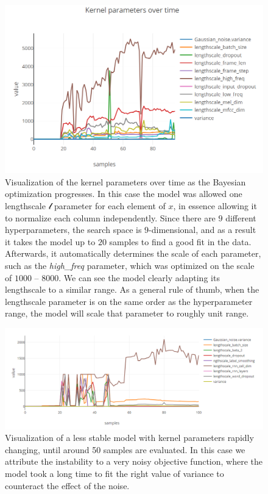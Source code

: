\begin{figure}
	\begin{center}
		\includegraphics[width=1.0\textwidth]{images/kernel-params-over-time.png}
		\caption{Visualization of the kernel parameters over time as the Bayesian optimization progresses. In this case the model was allowed one lengthscale $\mathcal{l}$ parameter for each element of $x$, in essence allowing it to normalize each column independently. Since there are $9$ different hyperparameters, the search space is $9$-dimensional, and as a result it takes the model up to $20$ samples to find a good fit in the data. Afterwards, it automatically determines the scale of each parameter, such as the \emph{high\_freq} parameter, which was optimized on the scale of $1000$ -- $8000$. We can see the model clearly adapting its lengthscale to a similar range. As a general rule of thumb, when the lengthscale parameter is on the same order as the hyperparameter range, the model will scale that parameter to roughly unit range.}
		\label{figure:kernel-parameters-over-time}
	\end{center}
\end{figure}

\begin{figure}
	\begin{center}
		\includegraphics[width=1.0\textwidth]{images/kernel-parameters-over-time-jumpy.png}
		\caption{Visualization of a less stable model with kernel parameters rapidly changing, until around 50 samples are evaluated. In this case we attribute the instability to a very noisy objective function, where the model took a long time to fit the right value of variance to counteract the effect of the noise.}
		\label{figure:kernel-parameters-over-time-jumpy}
	\end{center}
\end{figure}

